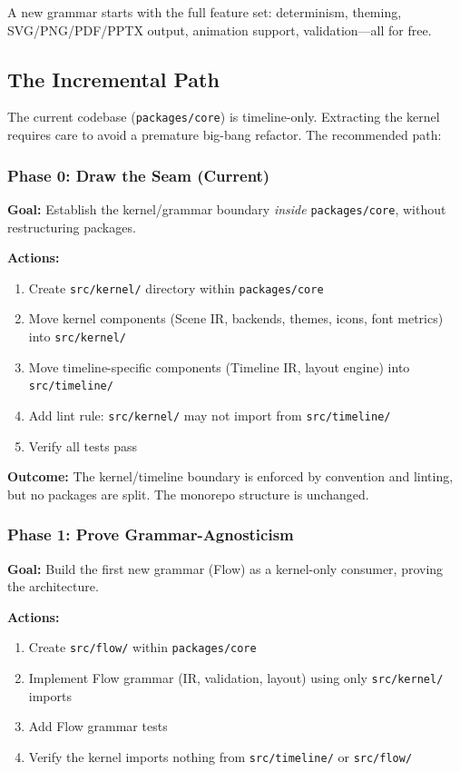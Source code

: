 A new grammar starts with the full feature set: determinism, theming, SVG/PNG/PDF/PPTX output, animation support, validation---all for free.

\subsection{The Incremental Path}

The current codebase (\texttt{packages/core}) is timeline-only. Extracting the kernel requires care to avoid a premature big-bang refactor. The recommended path:

\subsubsection{Phase 0: Draw the Seam (Current)}

\textbf{Goal:} Establish the kernel/grammar boundary \emph{inside} \texttt{packages/core}, without restructuring packages.

\textbf{Actions:}
\begin{enumerate}
  \item Create \texttt{src/kernel/} directory within \texttt{packages/core}
  \item Move kernel components (Scene IR, backends, themes, icons, font metrics) into \texttt{src/kernel/}
  \item Move timeline-specific components (Timeline IR, layout engine) into \texttt{src/timeline/}
  \item Add lint rule: \texttt{src/kernel/} may not import from \texttt{src/timeline/}
  \item Verify all tests pass
\end{enumerate}

\textbf{Outcome:} The kernel/timeline boundary is enforced by convention and linting, but no packages are split. The monorepo structure is unchanged.

\subsubsection{Phase 1: Prove Grammar-Agnosticism}

\textbf{Goal:} Build the first new grammar (Flow) as a kernel-only consumer, proving the architecture.

\textbf{Actions:}
\begin{enumerate}
  \item Create \texttt{src/flow/} within \texttt{packages/core}
  \item Implement Flow grammar (IR, validation, layout) using only \texttt{src/kernel/} imports
  \item Add Flow grammar tests
  \item Verify the kernel imports nothing from \texttt{src/timeline/} or \texttt{src/flow/}
\end{enumerate}

